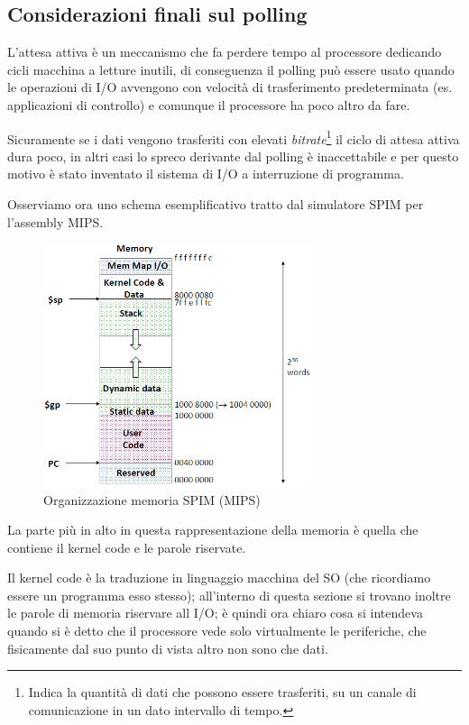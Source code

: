 \documentclass[class=book, crop=false, oneside]{standalone}
\begin{document}
\subsection{Considerazioni finali sul polling}
L'attesa attiva è un meccanismo che fa perdere tempo al processore dedicando cicli macchina a letture inutili, di conseguenza il polling può essere usato quando le operazioni di I/O avvengono con velocità di trasferimento predeterminata (es. applicazioni di controllo) e comunque il processore ha poco altro da fare.

Sicuramente se i dati vengono trasferiti con elevati \emph{bitrate}\footnote{Indica la quantità di dati che possono essere trasferiti, su un canale di comunicazione in un dato intervallo di tempo.} il ciclo di attesa attiva dura poco, in altri casi lo spreco derivante dal polling è inaccettabile e per questo motivo è stato inventato il sistema di I/O a interruzione di programma.

Osserviamo ora uno schema esemplificativo tratto dal simulatore SPIM per l'assembly MIPS.
\begin{figure}[!h]
	\centering
	\includegraphics[width=0.7\textwidth,keepaspectratio]{SPIM}
	\caption{Organizzazione memoria SPIM (MIPS)}
\end{figure}
La parte più in alto in questa rappresentazione della memoria è quella che contiene il kernel code e le parole riservate.

Il kernel code è la traduzione in linguaggio macchina del SO (che ricordiamo essere un programma esso stesso); all'interno di questa sezione si trovano inoltre le parole di memoria riservare all I/O; è quindi ora chiaro cosa si intendeva quando si è detto che il processore vede solo virtualmente le periferiche, che fisicamente dal suo punto di vista altro non sono che dati.
\end{document}
